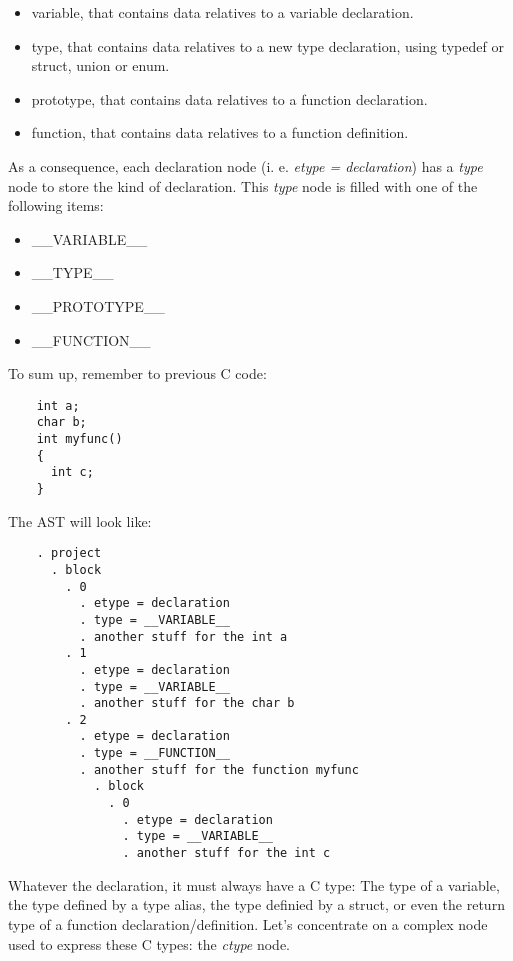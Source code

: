 \documentclass[a4paper,11pt]{report}
\begin{document}
  \begin{itemize}
    \item variable, that contains data relatives to a variable declaration.
    \item type, that contains data relatives to a new type declaration, using
      typedef or struct, union or enum.
    \item prototype, that contains data relatives to a function declaration.
    \item function, that contains data relatives to a function definition.
  \end{itemize}

  As a consequence, each declaration node (i. e. \textit{etype = declaration})
  has a \textit{type} node to store the kind of declaration. This
  \textit{type} node is filled with one of the following items:

  \begin{itemize}
    \item \_\_VARIABLE\_\_
    \item \_\_TYPE\_\_
    \item \_\_PROTOTYPE\_\_
    \item \_\_FUNCTION\_\_
  \end{itemize}
  
  To sum up, remember to previous C code:

  \begin{lstlisting}
    int a;
    char b;
    int myfunc()
    {
      int c;
    }
  \end{lstlisting}

  The AST will look like:

  \begin{lstlisting}
    . project
      . block
        . 0
          . etype = declaration
          . type = __VARIABLE__
          . another stuff for the int a
        . 1
          . etype = declaration
          . type = __VARIABLE__
          . another stuff for the char b
        . 2
          . etype = declaration
          . type = __FUNCTION__
          . another stuff for the function myfunc
            . block
              . 0
                . etype = declaration
                . type = __VARIABLE__
                . another stuff for the int c
  \end{lstlisting}

  Whatever the declaration, it must always have a C type: The type of a
  variable, the type defined by a type alias, the type definied by a struct,
  or even the return type of a function declaration/definition.
  Let's concentrate on a complex node used to express these C types: the
  \textit{ctype} node.
\end{document}
